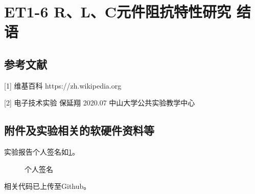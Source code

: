 \documentclass[dvipsnames, svgnames,a4paper,11pt]{article}
\begin{document}
\begin{enumerate}
\begin{enumerate}
					






			\end{enumerate}
			
	\end{enumerate}
	
	
	
	
	
	
	\clearpage
	
	\section{ET1-6 R、L、C元件阻抗特性研究 \quad\heiti 结语}
	
	
	
	\subsection{参考文献}
	[1] 维基百科 https://zh.wikipedia.org
	
	[2] 电子技术实验 保延翔 2020.07 中山大学公共实验教学中心
	
	
	\subsection{附件及实验相关的软硬件资料等}
	
	实验报告个人签名如\cref{fig:name}。
	
	\begin{figure}[htbp]
		\centering
		\caption{个人签名}
		\label{fig:name}			
	\end{figure}
	
	
	相关代码已上传至Github。
	
	
	
\end{document}
